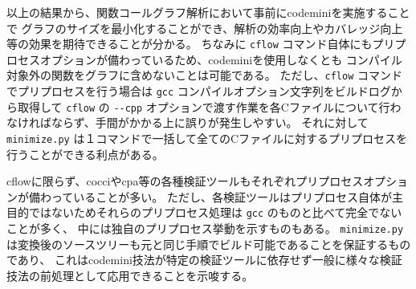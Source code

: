 \par
以上の結果から、関数コールグラフ解析において事前に\acrshort{codemini}を実施することで
グラフのサイズを最小化することができ、解析の効率向上やカバレッジ向上等の効果を期待できることが分かる。
ちなみに \verb|cflow| コマンド自体にもプリプロセスオプションが備わっているため、\acrshort{codemini}を使用しなくとも
コンパイル対象外の関数をグラフに含めないことは可能である。
ただし、\verb|cflow| コマンドでプリプロセスを行う場合は \verb|gcc| コンパイルオプション文字列をビルドログから取得して
\verb|cflow| の \verb|--cpp| オプションで渡す作業を各Cファイルについて行わなければならず、手間がかかる上に誤りが発生しやすい。
それに対して \verb|minimize.py| は１コマンドで一括して全てのCファイルに対するプリプロセスを行うことができる利点がある。
\par
\acrshort{cflow}に限らず、\acrshort{cocci}や\acrshort{cpa}等の各種検証ツールもそれぞれプリプロセスオプションが備わっていることが多い。
ただし、各検証ツールはプリプロセス自体が主目的ではないためそれらのプリプロセス処理は \verb|gcc| のものと比べて完全でないことが多く、
中には独自のプリプロセス挙動を示すものもある。
\verb|minimize.py| は変換後のソースツリーも元と同じ手順でビルド可能であることを保証するものであり、
これは\acrshort{codemini}技法が特定の検証ツールに依存せず一般に様々な検証技法の前処理として応用できることを示唆する。

